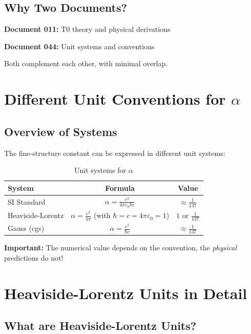 	\subsection{Why Two Documents?}
	
	\textbf{Document 011:} T0 theory and physical derivations
	
	\textbf{Document 044:} Unit systems and conventions
	
	Both complement each other, with minimal overlap.
	
	\section{Different Unit Conventions for $\alpha$}
	
	\subsection{Overview of Systems}
	
	The fine-structure constant can be expressed in different unit systems:
	
	\begin{table}[h]
		\centering
		\begin{tabular}{|l|c|c|}
			\hline
			\textbf{System} & \textbf{Formula} & \textbf{Value} \\
			\hline
			SI Standard & $\alpha = \frac{e^2}{4\pi\varepsilon_0\hbar c}$ & $\approx \frac{1}{137}$ \\
			Heaviside-Lorentz & $\alpha = \frac{e^2}{4\pi}$ (with $\hbar = c = 4\pi\varepsilon_0 = 1$) & $1$ or $\frac{1}{137}$ \\
			Gauss (cgs) & $\alpha = \frac{e^2}{\hbar c}$ & $\approx \frac{1}{137}$ \\
			\hline
		\end{tabular}
		\caption{Unit systems for $\alpha$}
	\end{table}
	
	\textbf{Important:} The numerical value depends on the convention, the \textit{physical} predictions do not!
	
	\section[Heaviside-Lorentz Units in Detail]{Heaviside-Lorentz Units in Detail}
	
	\subsection{What are Heaviside-Lorentz Units?}
	
